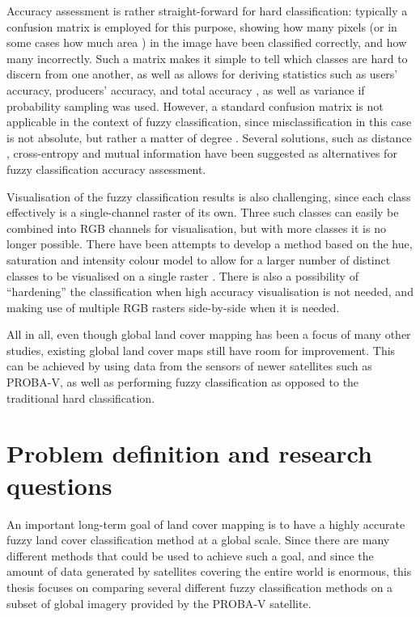 \documentclass[a4paper,12pt]{scrbook}
\begin{document}
Accuracy assessment is rather straight-forward for hard classification: typically a confusion matrix is employed for this purpose, showing how many pixels (or in some cases how much area \citep{stehman2009sampling}) in the image have been classified correctly, and how many incorrectly. Such a matrix makes it simple to tell which classes are hard to discern from one another, as well as allows for deriving statistics such as users' accuracy, producers' accuracy, and total accuracy \citep{foody1996fuzzyevaluation}, as well as variance if probability sampling was used. However, a standard confusion matrix is not applicable in the context of fuzzy classification, since misclassification in this case is not absolute, but rather a matter of degree \citep{foody2002accuracy}. Several solutions, such as distance \citep{foody1996fuzzyevaluation}, cross-entropy and mutual information \citep{lu2007methods} have been suggested as alternatives for fuzzy classification accuracy assessment.

Visualisation of the fuzzy classification results is also challenging, since each class effectively is a single-channel raster of its own. Three such classes can easily be combined into RGB channels for visualisation, but with more classes it is no longer possible. There have been attempts to develop a method based on the hue, saturation and intensity colour model to allow for a larger number of distinct classes to be visualised on a single raster \citep{hengl2004fuzzycmeans}. There is also a possibility of ``hardening'' the classification when high accuracy visualisation is not needed, and making use of multiple RGB rasters side-by-side when it is needed.

All in all, even though global land cover mapping has been a focus of many other studies, existing global land cover maps still have room for improvement. This can be achieved by using data from the sensors of newer satellites such as PROBA-V, as well as performing fuzzy classification as opposed to the traditional hard classification.

\chapter{Problem definition and research questions}

An important long-term goal of land cover mapping is to have a highly accurate fuzzy land cover classification method at a global scale. Since there are many different methods that could be used to achieve such a goal, and since the amount of data generated by satellites covering the entire world is enormous, this thesis focuses on comparing several different fuzzy classification methods on a subset of global imagery provided by the PROBA-V satellite.
\end{document}
